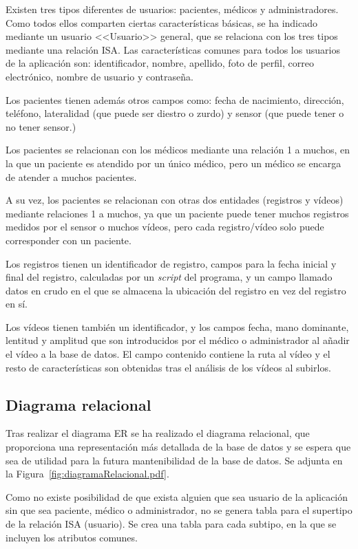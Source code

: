 Existen tres tipos diferentes de usuarios: pacientes, médicos y administradores. Como todos ellos comparten ciertas características básicas, se ha indicado mediante un usuario <<Usuario>> general, que se relaciona con los tres tipos mediante una relación ISA. 
Las características comunes para todos los usuarios de la aplicación son: identificador, nombre, apellido, foto de perfil, correo electrónico, nombre de usuario y contraseña.

Los pacientes tienen además otros campos como: fecha de nacimiento, dirección, teléfono, lateralidad (que puede ser diestro o zurdo) y sensor (que puede tener o no tener sensor.)

Los pacientes se relacionan con los médicos mediante una relación 1 a muchos, en la que un paciente es atendido por un único médico, pero un médico se encarga de atender a muchos pacientes.

A su vez, los pacientes se relacionan con otras dos entidades (registros y vídeos) mediante relaciones 1 a muchos, ya que un paciente puede tener muchos registros medidos por el sensor o muchos vídeos, pero cada registro/vídeo solo puede corresponder con un paciente.

Los registros tienen un identificador de registro, campos para la fecha inicial y final del registro, calculadas por un \textit{script} del programa, y un campo llamado datos en crudo en el que se almacena la ubicación del registro en vez del registro en sí.

Los vídeos tienen también un identificador, y los campos fecha, mano dominante, lentitud y amplitud que son introducidos por el médico o administrador al añadir el vídeo a la base de datos. El campo contenido contiene la ruta al vídeo y el resto de características son obtenidas tras el análisis de los vídeos al subirlos.


\subsection{Diagrama relacional}
Tras realizar el diagrama ER se ha realizado el diagrama relacional, que proporciona una representación más detallada de la base de datos y se espera que sea de utilidad para la futura mantenibilidad de la base de datos. Se adjunta en la Figura~\ref{fig:diagramaRelacional.pdf}.

Como no existe posibilidad de que exista alguien que sea usuario de la aplicación sin que sea paciente, médico o administrador, no se genera tabla para el supertipo de la relación ISA (usuario). Se crea una tabla para cada subtipo, en la que se incluyen los atributos comunes.

